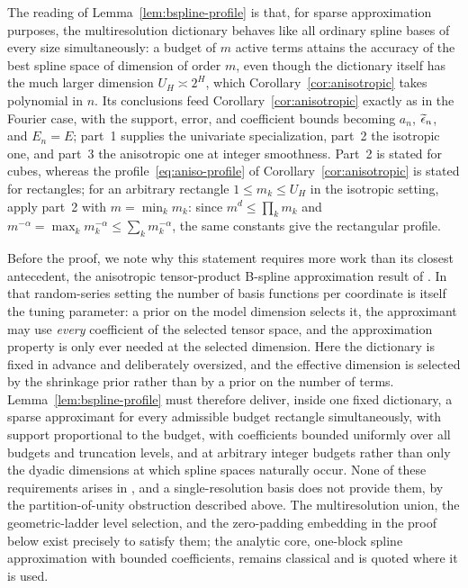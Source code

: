 The reading of Lemma~\ref{lem:bspline-profile} is that, for sparse approximation purposes, the multiresolution dictionary behaves like all ordinary spline bases of every size simultaneously: a budget of $m$ active terms attains the accuracy of the best spline space of dimension of order $m$, even though the dictionary itself has the much larger dimension $U_H\asymp2^H$, which Corollary~\ref{cor:anisotropic} takes polynomial in $n$. Its conclusions feed Corollary~\ref{cor:anisotropic} exactly as in the Fourier case, with the support, error, and coefficient bounds becoming $a_n$, $\widetilde{\epsilon}_n$, and $E_n=E$; part~1 supplies the univariate specialization, part~2 the isotropic one, and part~3 the anisotropic one at integer smoothness. Part~2 is stated for cubes, whereas the profile~\eqref{eq:aniso-profile} of Corollary~\ref{cor:anisotropic} is stated for rectangles; for an arbitrary rectangle $1\leq m_k\leq U_H$ in the isotropic setting, apply part~2 with $m=\min_km_k$: since $m^d\leq\prod_km_k$ and $m^{-\alpha}=\max_km_k^{-\alpha}\leq\sum_km_k^{-\alpha}$, the same constants give the rectangular profile.

Before the proof, we note why this statement requires more work than its closest antecedent, the anisotropic tensor-product B-spline approximation result of \citet[Lemma~2]{ShenGhosal2015}. In that random-series setting the number of basis functions per coordinate is itself the tuning parameter: a prior on the model dimension selects it, the approximant may use \emph{every} coefficient of the selected tensor space, and the approximation property is only ever needed at the selected dimension. Here the dictionary is fixed in advance and deliberately oversized, and the effective dimension is selected by the shrinkage prior rather than by a prior on the number of terms. Lemma~\ref{lem:bspline-profile} must therefore deliver, inside one fixed dictionary, a sparse approximant for every admissible budget rectangle simultaneously, with support proportional to the budget, with coefficients bounded uniformly over all budgets and truncation levels, and at arbitrary integer budgets rather than only the dyadic dimensions at which spline spaces naturally occur. None of these requirements arises in \citet{ShenGhosal2015}, and a single-resolution basis does not provide them, by the partition-of-unity obstruction described above. The multiresolution union, the geometric-ladder level selection, and the zero-padding embedding in the proof below exist precisely to satisfy them; the analytic core, one-block spline approximation with bounded coefficients, remains classical and is quoted where it is used.

